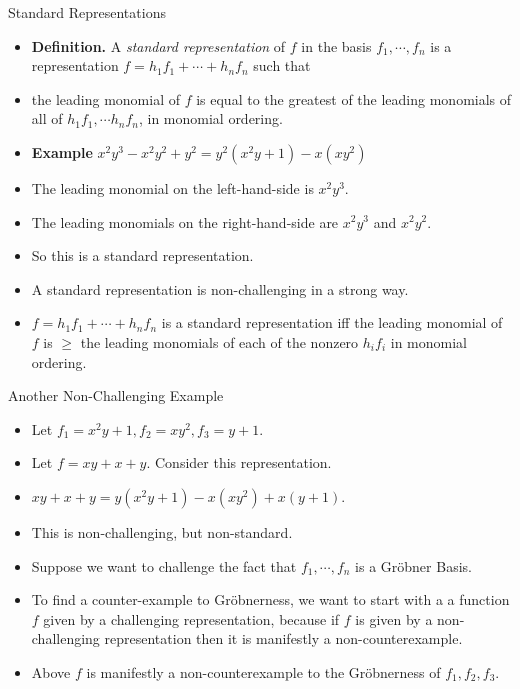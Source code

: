 \documentclass{beamer}
\begin{document}
\begin{frame}{Standard Representations}

\begin{itemize}
  \item \textbf{Definition.} A \emph{standard representation} of $f$ in the basis
  $f_1,\cdots,f_n$ is a representation $f=h_1f_1 + \cdots + h_n f_n$ such that
  \item the leading monomial of $f$ is equal to the greatest of the leading monomials of
  all of $h_1 f_1, \cdots h_n f_n$, in monomial ordering.
  \item \textbf{Example} $x^2y^3 - x^2 y^2 + y^2 = y^2(x^2y+1) -x(xy^2)$
  \item The leading monomial on the left-hand-side is $x^2y^3$.
  \item The leading monomials on the right-hand-side are $x^2y^3$ and $x^2y^2$.
  \item So this is a standard representation.
  \item A standard representation is non-challenging in a strong way.
  \item $f=h_1f_1 + \cdots + h_n f_n$ is a standard representation iff the leading monomial of $f$ is $\geq$ the leading
  monomials of each of the nonzero $h_i f_i$ in monomial ordering.
\end{itemize}
\end{frame}

\begin{frame}{Another Non-Challenging Example}

\begin{itemize}
  \item Let $f_1 = x^2y+1, f_2 = xy^2, f_3 = y + 1$.
  \item Let $f = xy +x + y$. Consider this representation.
  \item $xy +x + y = y(x^2y+1) -x(xy^2) + x(y +1)$.
  \item This is non-challenging, but non-standard.
  \item Suppose we want to challenge the fact that $f_1,\cdots, f_n$ is a
  Gr\"{o}bner Basis.
  \item To find a counter-example to Gr\"{o}bnerness, we want to start with a
  a function $f$ given by a challenging representation, because if $f$ is given
  by a non-challenging representation then it is manifestly a non-counterexample.
  \item Above $f$ is manifestly a non-counterexample to the Gr\"{o}bnerness of
  $f_1,f_2,f_3$.
\end{itemize}
\end{frame}
\end{document}
